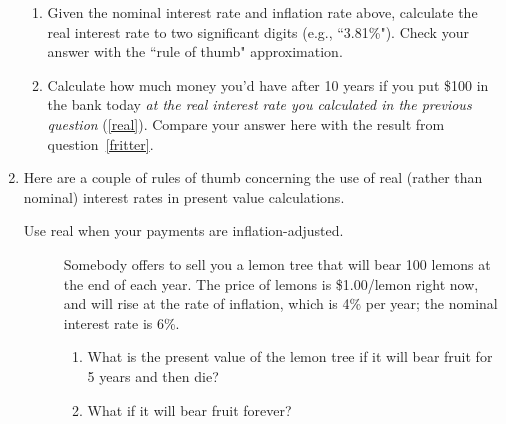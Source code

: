 \begin{enumerate}
\begin{enumerate}
    \item \label{real} Given the nominal interest rate and inflation rate above, calculate the real interest rate to two significant digits (e.g., ``3.81\%"). Check your answer with the ``rule of thumb" approximation.

    \item Calculate how much money you'd have after 10 years if you put \$100 in the bank today \emph{at the real interest rate you calculated in the previous question} (\ref{real}). Compare your answer here with the result from question~\ref{fritter}.

    \end{enumerate}



\item \label{realnominal} Here are a couple of rules of thumb concerning the use of real (rather than nominal) interest rates in present value calculations.

    \begin{description}
    \item[Use real when your payments are inflation-adjusted.] Somebody offers to sell you a lemon tree that will bear 100 lemons at the end of each year. The price of lemons is \$1.00/lemon right now, and will rise at the rate of inflation, which is 4\% per year; the nominal interest rate is 6\%.

        \begin{enumerate}

        \item What is the present value of the lemon tree if it will bear fruit for 5 years and then die?

        \item What if it will bear fruit forever?

        \end{enumerate}



\end{description}
\end{enumerate}

